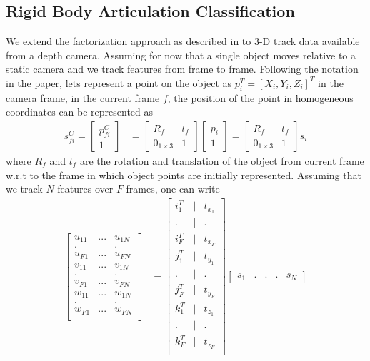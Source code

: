 \documentclass[conference]{IEEEtran}
\begin{document}
\subsection{Rigid Body Articulation Classification}
We extend the factorization approach as described in \cite{costeira1998multibody} to 3-D track data available from a depth camera. Assuming for now that a single object moves relative to a static camera and we track features from frame to frame. Following the notation in the paper, lets represent a point on the object as $p_i^T = [X_i,Y_i,Z_i]^T$ in the camera frame, in the current frame $f$, the position of the point in homogeneous coordinates can be represented as 
\begin{align}
s_{fi}^C = \begin{bmatrix} 
p_{fi}^C\\1
\end{bmatrix}
&=\begin{bmatrix}
R_f & t_f\\
0_{1\times3}& 1
\end{bmatrix}
\begin{bmatrix}
p_i\\
1
\end{bmatrix}
= \begin{bmatrix}
R_f & t_f\\
0_{1\times3}& 1
\end{bmatrix}
s_i
\end{align}
where $R_f$ and $t_f$ are the rotation and translation of the object from current frame w.r.t to the frame in which object points are initially represented. Assuming that we track $N$ features over $F$ frames, one can write 
\begin{align}
\begin{bmatrix}
u_{11} & ... & u_{1N} \\ 
. &  & .\\
u_{F1} & ... & u_{FN} \\ 
v_{11} & ... & v_{1N} \\ 
. &  & .\\
v_{F1} & ... & v_{FN} \\ 
w_{11} & ... & w_{1N} \\ 
. &  & .\\
w_{F1} & ... & w_{FN} \\ 
\end{bmatrix} & = 
\begin{bmatrix}
i_1^T & | & t_{x_1}\\
. & | & .\\
i_F^T & | & t_{x_F}\\
j_1^T & | & t_{y_1}\\
. & | & .\\
j_F^T & | & t_{y_F}\\
k_1^T & | & t_{z_1}\\
. & | & .\\
k_F^T & | & t_{z_F}\\
\end{bmatrix}
\begin{bmatrix}
s_1 & . & . &. & s_N
\end{bmatrix}\label{eq:global_motion}
\end{align}
\end{document}
